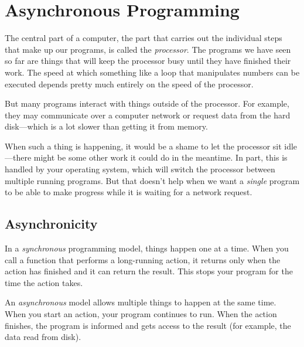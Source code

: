 \chapter{Asynchronous Programming}\label{async}


The central part of a computer, the part that carries out the individual steps that make up our programs, is called the \emph{processor}. The programs we have seen so far are things that will keep the processor busy until they have finished their work. The speed at which something like a loop that manipulates numbers can be executed depends pretty much entirely on the speed of the processor.

But many programs interact with things outside of the processor. For example, they may communicate over a computer network or request data from the hard disk—which is a lot slower than getting it from memory.

When such a thing is happening, it would be a shame to let the processor sit idle—there might be some other work it could do in the meantime. In part, this is handled by your operating system, which will switch the processor between multiple running programs. But that doesn't help when we want a \emph{single} program to be able to make progress while it is waiting for a network request.

\section{Asynchronicity}

In a \emph{synchronous} programming model, things happen one at a time. When you call a function that performs a long-running action, it returns only when the action has finished and it can return the result. This stops your program for the time the action takes.

An \emph{asynchronous} model allows multiple things to happen at the same time. When you start an action, your program continues to run. When the action finishes, the program is informed and gets access to the result (for example, the data read from disk).


